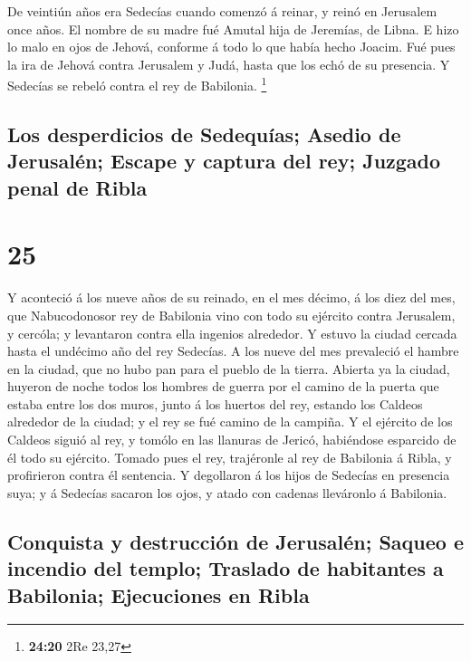  De veintiún años era Sedecías cuando comenzó á reinar, y
reinó en Jerusalem once años. El nombre de su madre fué Amutal hija de
Jeremías, de Libna.  E hizo lo malo en ojos de Jehová,
conforme á todo lo que había hecho Joacim.  Fué pues la ira
de Jehová contra Jerusalem y Judá, hasta que los echó de su presencia. Y
Sedecías se rebeló contra el rey de Babilonia. \footnote{\textbf{24:20}
  2Re 23,27}

\hypertarget{los-desperdicios-de-sedequuxedas-asedio-de-jerusaluxe9n-escape-y-captura-del-rey-juzgado-penal-de-ribla}{%
\subsection{Los desperdicios de Sedequías; Asedio de Jerusalén; Escape y
captura del rey; Juzgado penal de
Ribla}\label{los-desperdicios-de-sedequuxedas-asedio-de-jerusaluxe9n-escape-y-captura-del-rey-juzgado-penal-de-ribla}}

\hypertarget{section-24}{%
\section{25}\label{section-24}}

 Y aconteció á los nueve años de su reinado, en el mes
décimo, á los diez del mes, que Nabucodonosor rey de Babilonia vino con
todo su ejército contra Jerusalem, y cercóla; y levantaron contra ella
ingenios alrededor.  Y estuvo la ciudad cercada hasta el
undécimo año del rey Sedecías.  A los nueve del mes
prevaleció el hambre en la ciudad, que no hubo pan para el pueblo de la
tierra.  Abierta ya la ciudad, huyeron de noche todos los
hombres de guerra por el camino de la puerta que estaba entre los dos
muros, junto á los huertos del rey, estando los Caldeos alrededor de la
ciudad; y el rey se fué camino de la campiña.  Y el ejército
de los Caldeos siguió al rey, y tomólo en las llanuras de Jericó,
habiéndose esparcido de él todo su ejército.  Tomado pues el
rey, trajéronle al rey de Babilonia á Ribla, y profirieron contra él
sentencia.  Y degollaron á los hijos de Sedecías en
presencia suya; y á Sedecías sacaron los ojos, y atado con cadenas
lleváronlo á Babilonia.

\hypertarget{conquista-y-destrucciuxf3n-de-jerusaluxe9n-saqueo-e-incendio-del-templo-traslado-de-habitantes-a-babilonia-ejecuciones-en-ribla}{%
\subsection{Conquista y destrucción de Jerusalén; Saqueo e incendio del
templo; Traslado de habitantes a Babilonia; Ejecuciones en
Ribla}\label{conquista-y-destrucciuxf3n-de-jerusaluxe9n-saqueo-e-incendio-del-templo-traslado-de-habitantes-a-babilonia-ejecuciones-en-ribla}}

